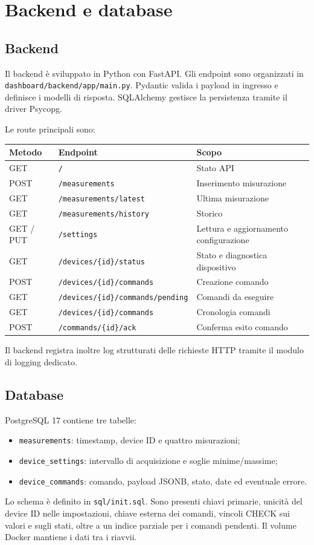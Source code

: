 \chapter{Backend e database}

\section{Backend}
Il backend è sviluppato in Python con FastAPI. Gli endpoint sono organizzati in \texttt{dashboard/backend/app/main.py}. Pydantic valida i payload in ingresso e definisce i modelli di risposta. SQLAlchemy gestisce la persistenza tramite il driver Psycopg.

Le route principali sono:
\begin{longtable}{p{}p{}p{}}
\toprule
\textbf{Metodo} & \textbf{Endpoint} & \textbf{Scopo}\\
\midrule
GET & \texttt{/} & Stato API\\
POST & \texttt{/measurements} & Inserimento misurazione\\
GET & \texttt{/measurements/latest} & Ultima misurazione\\
GET & \texttt{/measurements/history} & Storico\\
GET / PUT & \texttt{/settings} & Lettura e aggiornamento configurazione\\
GET & \texttt{/devices/\{id\}/status} & Stato e diagnostica dispositivo\\
POST & \texttt{/devices/\{id\}/commands} & Creazione comando\\
GET & \texttt{/devices/\{id\}/commands/pending} & Comandi da eseguire\\
GET & \texttt{/devices/\{id\}/commands} & Cronologia comandi\\
POST & \texttt{/commands/\{id\}/ack} & Conferma esito comando\\
\bottomrule
\end{longtable}

Il backend registra inoltre log strutturati delle richieste HTTP tramite il modulo di logging dedicato.

\section{Database}
PostgreSQL 17 contiene tre tabelle:
\begin{itemize}
    \item \texttt{measurements}: timestamp, device ID e quattro misurazioni;
    \item \texttt{device\_settings}: intervallo di acquisizione e soglie minime/massime;
    \item \texttt{device\_commands}: comando, payload JSONB, stato, date ed eventuale errore.
\end{itemize}

Lo schema è definito in \texttt{sql/init.sql}. Sono presenti chiavi primarie, unicità del device ID nelle impostazioni, chiave esterna dei comandi, vincoli CHECK sui valori e sugli stati, oltre a un indice parziale per i comandi pendenti. Il volume Docker mantiene i dati tra i riavvii.
